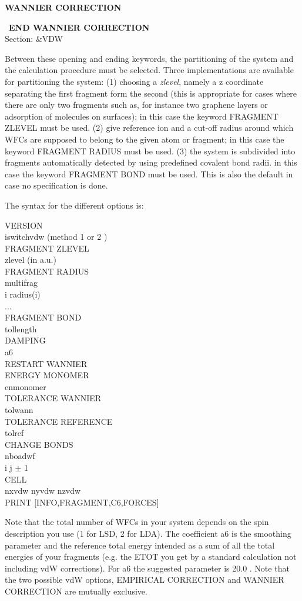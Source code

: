 \documentclass[twoside,10pt,titlepage,a4paper]{article}
\newcommand{\reflabel}[1]{\hypertarget{#1}}
\newcommand{\reflabel}[1]{\label{#1}}
\newcommand{\keyword}[5]{%
\vspace{1.0cm}
\begin{minipage}{15cm}
\reflabel{#1}{\textbf{\large #1}}%
\index{#1}%
\ \textbf{#2}%
\ \textbf{#3}%
\ \textit{#4}%
     \hfill\\\smallskip
     {Section: #5}
     \hfill\\\smallskip\vskip 10pt
\end{minipage}
}%
\newcommand{\desc}[1]{%
   \hspace*{\fill} \parbox{130mm}{\sloppy
                          {#1}%
                             }
     \hfill\\\smallskip
   }%
\newcommand{\desc}[1]{#1\vspace{1ex}}
\begin{document}
\keyword{WANNIER CORRECTION}{END WANNIER CORRECTION}{}{}{\&VDW}
\desc{Between these opening and ending keywords, the partitioning of the system
 and the calculation procedure must be selected. Three implementations are available
 for partitioning the system: 
 (1) choosing a {\it zlevel}, namely a z coordinate separating
  the first fragment form the second (this is appropriate for cases where
  there are only two fragments such as, for instance two graphene layers or
  adsorption of molecules on surfaces); in this case the keyword FRAGMENT ZLEVEL
  must be used. 
 (2) give reference ion and a cut-off radius around which WFCs  are supposed to 
  belong to the given atom or fragment; in this case the keyword FRAGMENT RADIUS
  must be used.
 (3) the system is subdivided into fragments automatically detected by using 
  predefined covalent bond radii. in this case the keyword FRAGMENT BOND
  must be used. This is also the default in case no specification is done.
 
  The syntax for the different options is:

    VERSION \\
     iswitchvdw (method 1 \cite{psil1} or 2 \cite{psil2}) \\
    FRAGMENT ZLEVEL \\
     zlevel (in a.u.) \\
   FRAGMENT RADIUS \\
     multifrag \\
     i radius(i) \\
     ... \\
   FRAGMENT BOND \\
     tollength  \\
   DAMPING \\
     a6 \\
   RESTART WANNIER \\
   ENERGY MONOMER \\
     enmonomer \\
   TOLERANCE WANNIER \\
     tolwann  \\
   TOLERANCE REFERENCE \\
     tolref \\
   CHANGE BONDS \\
    nboadwf \\
    i  j $\pm$ 1  \\
   CELL \\
    nxvdw nyvdw nzvdw \\
   PRINT $[$INFO,FRAGMENT,C6,FORCES$]$

  Note that the total number of WFCs in your system depends on the
  spin description you use (1 for LSD, 2 for LDA).
  The coefficient a6 is the smoothing parameter and the
  reference total energy intended as a sum of all the total energies
  of your fragments (e.g. the ETOT you get by a standard calculation
  not including vdW corrections). For a6 the suggested parameter is
  20.0 \cite{molphy}.
  Note that the two possible vdW options, EMPIRICAL CORRECTION  and
  WANNIER CORRECTION are mutually exclusive.}
\end{document}
